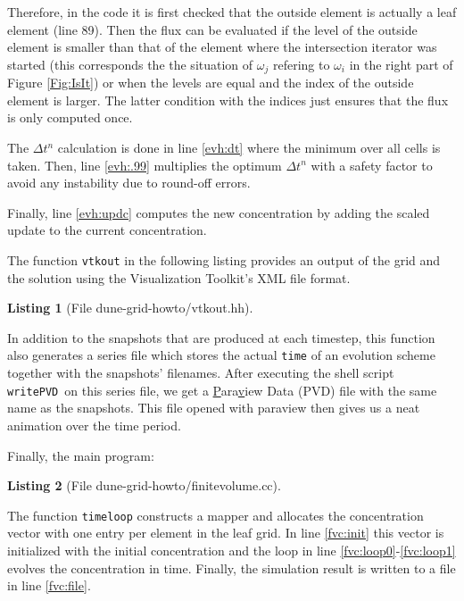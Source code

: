 \documentclass[11pt,a4paper,headinclude,footinclude,DIV16,normalheadings]{scrreprt}
\newtheorem{lst}{Listing}
\begin{document}
Therefore, in the code it is first checked that the outside element is
actually a leaf element (line 89). Then the flux can be evaluated if
the level of the outside element is smaller than that of the element
where the intersection iterator was started (this corresponds the the
situation of $\omega_j$ refering to $\omega_i$ in the right part of Figure
\ref{Fig:IsIt}) or when the levels are equal and the index of
the outside element is larger. The latter condition with the indices
just ensures that the flux is only computed once.

The $\Delta t^n$ calculation is done in line \ref{evh:dt} where the
minimum over all cells is taken. Then, line \ref{evh:.99} multiplies
the optimum $\Delta t^n$ with a safety factor to avoid any instability
due to round-off errors.

Finally, line \ref{evh:updc} computes the new concentration by adding
the scaled update to the current concentration.

The function \lstinline!vtkout! in the following listing provides an
output of the grid and the solution using the Visualization Toolkit's \cite{VTK}
XML file format.

\begin{lst}[File dune-grid-howto/vtkout.hh] \mbox{}
\nopagebreak

\end{lst}

In addition to the snapshots that are produced at each timestep, this function
also generates a series file which stores the actual \lstinline!time! of an
evolution scheme together with the snapshots' filenames.  After executing the
shell script \lstinline!writePVD!\ on this series file, we get a
\underline{P}ara\underline{v}iew {D}ata (PVD) file with the same name as the
snapshots. This file opened with paraview then gives us a neat animation over
the time period.

Finally, the main program:

\begin{lst}[File dune-grid-howto/finitevolume.cc] \mbox{}
\nopagebreak

\end{lst}

The function \lstinline!timeloop! constructs a mapper and allocates the
concentration vector with one entry per element in the leaf grid. In
line \ref{fvc:init} this vector is initialized with the initial
concentration and the loop in line \ref{fvc:loop0}-\ref{fvc:loop1}
evolves the concentration in time. Finally, the simulation result is
written to a file in line \ref{fvc:file}.
\end{document}
